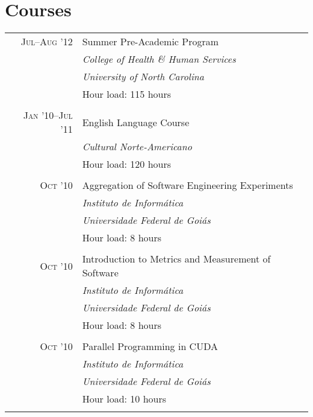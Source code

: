 \documentclass[a4paper,10pt]{article}
\begin{document}
\section{Courses}
\begin{tabular}{r|p{11cm}}

  \textsc{Jul--Aug '12} & Summer Pre-Academic Program\\ &
  \emph{College of Health \& Human Services}\\ &
  \emph{University of North Carolina}\\ &
  Hour load: 115 hours
  \\\multicolumn{2}{c}{} \\

  \textsc{Jan '10--Jul '11} & English Language Course\\ &
  \emph{Cultural Norte-Americano} \\ &
  Hour load: 120 hours
  \\\multicolumn{2}{c}{} \\

  \textsc{Oct '10} & Aggregation of Software Engineering Experiments\\ &
  \emph{Instituto de Informática} \\ &
  \emph{Universidade Federal de Goiás}\\ &
  Hour load: 8 hours
  \\\multicolumn{2}{c}{} \\

  \textsc{Oct '10} & Introduction to Metrics and Measurement of Software\\ &
  \emph{Instituto de Informática} \\ &
  \emph{Universidade Federal de Goiás}\\ &
  Hour load: 8 hours
  \\\multicolumn{2}{c}{} \\

  \textsc{Oct '10} & Parallel Programming in CUDA\\ &
  \emph{Instituto de Informática} \\ &
  \emph{Universidade Federal de Goiás}\\ &
  Hour load: 10 hours
  \\\multicolumn{2}{c}{} \\

\end{tabular}

\pagebreak
\end{document}
